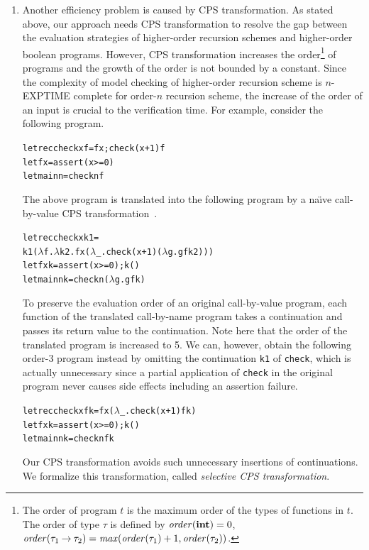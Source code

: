 \begin{enumerate}
\item Another efficiency problem is caused by CPS transformation.  As
      stated above, our approach needs CPS transformation to resolve the
      gap between the evaluation strategies of higher-order recursion
      schemes and higher-order boolean programs.  However, CPS
      transformation increases the order\footnote{The order of program
      $t$ is the maximum order of the types of functions in $t$.  The
      order of type $\tau$ is defined by $\mathit{order}(\mathbf{int})=0$,
      $\mathit{order}({\tau_1}\mathbin{\rightarrow}{\tau_2}) =
      \mathit{max}(\mathit{order}(\tau_1)+1, \mathit{order}(\tau_2))$.}
      of programs and the growth of the order is not bounded by a
      constant.  Since the complexity of model checking of higher-order
      recursion scheme is $n$-EXPTIME complete for order-$n$ recursion
      scheme, the increase of the order of an input is crucial to the
      verification time.
%
      For example, consider the following program.
\begin{alltt}
let rec check x f = f x; check (x+1) f
let f x = assert (x >= 0)
let main n = check n f
\end{alltt}
      The above program is translated into the following program by
      a na\"{\i}ve call-by-value CPS transformation~\cite{Plotkin1975}.
\begin{alltt}
let rec check x k1 =
  k1 (\(\lambda\)f.\(\lambda\)k2.f x (\(\lambda\)_.check (x+1) (\(\lambda\)g.g f k2)))
let f x k = assert (x >= 0); k ()
let main n k = check n (\(\lambda\)g. g f k)
\end{alltt}
      To preserve the evaluation order of an original call-by-value program,
      each function of the translated call-by-name program takes
      a continuation and passes its return value to the continuation.  Note here that the
      order of the translated program is increased to 5.
      We can, however, obtain the following order-3 program instead by omitting the continuation \texttt{k1} of \texttt{check},
      which is actually unnecessary since a partial application of \texttt{check} in the original program never causes side effects including an assertion failure.
\begin{alltt}
let rec check x f k = f x (\(\lambda\)_.check (x+1) f k)
let f x k = assert (x >= 0); k ()
let main n k = check n f k
\end{alltt}
      Our CPS transformation avoids such unnecessary insertions of
      continuations.  We formalize this transformation, called
      \emph{selective CPS transformation}.


\end{enumerate}
